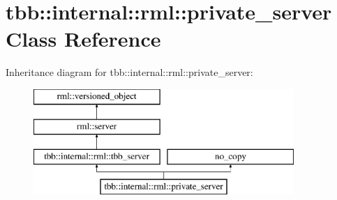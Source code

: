 \hypertarget{classtbb_1_1internal_1_1rml_1_1private__server}{}\section{tbb\+:\+:internal\+:\+:rml\+:\+:private\+\_\+server Class Reference}
\label{classtbb_1_1internal_1_1rml_1_1private__server}
Inheritance diagram for tbb\+:\+:internal\+:\+:rml\+:\+:private\+\_\+server\+:\begin{figure}[H]
\begin{center}
\leavevmode
\includegraphics[height=4.000000cm]{classtbb_1_1internal_1_1rml_1_1private__server}
\end{center}
\end{figure}
